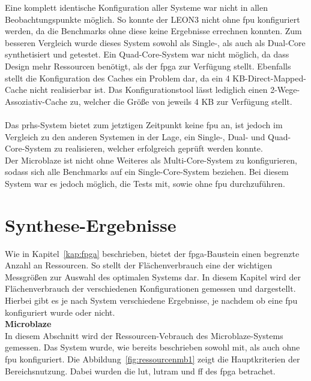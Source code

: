 Eine komplett identische Konfiguration aller Systeme war nicht in allen Beobachtungspunkte möglich. So konnte der LEON3 nicht ohne \ac{fpu} konfiguriert werden, da die Benchmarks ohne diese
keine Ergebnisse errechnen konnten. Zum besseren Vergleich wurde dieses System sowohl als Single-, als auch als Dual-Core synthetisiert und getestet. Ein Quad-Core-System war nicht möglich,
da dass Design mehr Ressourcen benötigt, als der \ac{fpga} zur Verfügung stellt. Ebenfalls stellt die Konfiguration
des Caches ein Problem dar, da ein 4 KB-Direct-Mapped-Cache nicht realisierbar ist. Das Konfigurationstool lässt lediglich einen 2-Wege-Assoziativ-Cache zu, welcher die Größe von jeweils 4 KB
zur Verfügung stellt.\\\\
Das \ac{prhs}-System bietet zum jetztigen Zeitpunkt keine \ac{fpu} an, ist jedoch im Vergleich zu den anderen Systemen in der Lage, ein Single-, Dual- und Quad-Core-System zu realisieren,
 welcher erfolgreich geprüft werden konnte.\\
 Der Microblaze ist nicht ohne Weiteres als Multi-Core-System zu konfigurieren, sodass sich alle Benchmarks auf ein Single-Core-System beziehen. Bei diesem System war es jedoch möglich,
 die Tests mit, sowie ohne \ac{fpu} durchzuführen.\\



\section{Synthese-Ergebnisse}\label{kap:synthese}
Wie in Kapitel~\ref{kap:fpga} beschrieben, bietet der \ac{fpga}-Baustein einen begrenzte Anzahl an Ressourcen. So stellt der Flächenverbrauch eine der wichtigen Messgrößen zur Auswahl des
optimalen Systems dar. In diesem Kapitel wird der Flächenverbrauch der verschiedenen Konfigurationen gemessen und dargestellt. Hierbei gibt es je nach System verschiedene Ergebnisse, je nachdem
ob eine \ac{fpu} konfiguriert wurde oder nicht.\\

\textbf{Microblaze}\\
In diesem Abschnitt wird der Ressourcen-Vebrauch des Microblaze-Systems gemessen. Das System wurde, wie bereits beschrieben sowohl mit, als auch ohne \ac{fpu} konfiguriert.
Die Abbildung~\ref{fig:ressourcenmb1} zeigt die Hauptkriterien der Bereichsnutzung. Dabei wurden die \ac{lut}, \ac{lutram} und \ac{ff} des \ac{fpga} betrachet.\\

